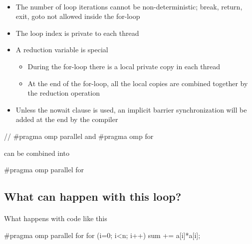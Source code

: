 \documentclass[%
oneside,                 %
final,                   %
10pt]{article}
\begin{document}
\paragraph{}
\begin{itemize}
\item The number of loop iterations cannot be non-deterministic; break, return, exit, goto not allowed inside the for-loop

\item The loop index is private to each thread

\item A reduction variable is special
\begin{itemize}

  \item During the for-loop there is a local private copy in each thread

  \item At the end of the for-loop, all the local copies are combined together by the reduction operation

\end{itemize}

\noindent
\item Unless the nowait clause is used, an implicit barrier synchronization will be added at the end by the compiler
\end{itemize}

\noindent


\bcppcod
// #pragma omp parallel and #pragma omp for

\ecppcod

can be combined into


\bcppcod
#pragma omp parallel for

\ecppcod



\subsection{What can happen with this loop?}


\paragraph{}
What happens with code like this 



\bcppcod
#pragma omp parallel for
for (i=0; i<n; i++) sum += a[i]*a[i];
\end{document}
